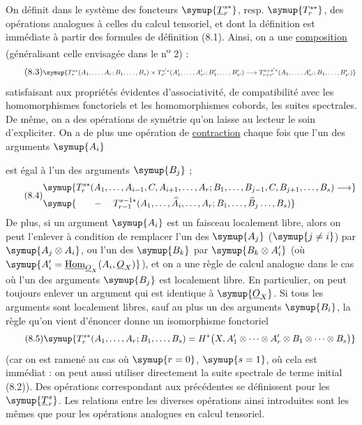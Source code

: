 On définit dans le système des foncteurs $\symup{\underline{T}_{r}^{s*}}$, resp.
$\symup{T_{r}^{s*}}$, des opérations analogues à celles du calcul tensoriel, et dont la
définition est immédiate à partir des formules de définition (8.1). Ainsi, on a
une \uline{composition} (généralisant celle envisagée dans le n\textsuperscript{o} 2) :
\begin{equation}\tag{8.3}
\resizebox{\textwidth}{!}{$\symup{
T_{r}^{s*}(A_1,\ldots,A_r;B_1,\ldots,B_s)
\times T_{r'}^{s'*}(A'_1,\ldots,A'_{r'};B'_1,\ldots,B'_{s'})
\longrightarrow T_{r+r'}^{s+s'*}
(A_1,\ldots,A'_{r'};B_1,\ldots,B'_{s'})
}$}
\end{equation}
satisfaisant aux propriétés évidentes d'associativité, de compatibilité avec
les homomorphismes fonctoriels et les homomorphismes cobords, les suites
spectrales. De même, on a des opérations de symétrie qu'on laisse au lecteur le
soin d'expliciter. On a de plus une opération de \uline{contraction} chaque fois que
l'un des arguments $\symup{A_i}$

est égal à l'un des arguments $\symup{B_j}$ ;
\begin{equation}\tag{8.4}
\resizebox{\textwidth}{!}{$
\begin{aligned}
&
\symup{T_{r}^{s*}(A_1,\ldots,A_{i-1},C,A_{i+1},\ldots,A_r;
 B_1,\ldots,B_{j-1},C,B_{j+1},\ldots,B_s)\longrightarrow}
\\
&
\symup{\qquad\relbar\quad
T_{r-1}^{s-1*}(A_1,\ldots,\widehat{A}_i,\ldots,A_r;
 B_1,\ldots,\widehat{B}_j\ldots,B_s)}
\end{aligned}
$}
\end{equation}
De plus, si un argument $\symup{A_i}$ est un faisceau localement libre, alors on peut
l'enlever à condition de remplacer l'un des $\symup{A_j}$ ($\symup{j\neq i}$) par
$\symup{A_j\otimes A_i}$, ou l'un des $\symup{B_k}$ par $\symup{B_k\otimes A_i'}$ (où
$\symup{A_i'=\Homsh_{\Osh_X}(A_i,\Osh_X)}$), et on a une règle de calcul analogue dans
le cas où l'un des arguments $\symup{B_j}$ est localement libre. En particulier, on
peut toujours enlever un argument qui est identique à $\symup{\Osh_X}$. Si tous les
arguments sont localement libres, sauf au plus un des arguments $\symup{B_i}$, la règle
qu'on vient d'énoncer donne un isomorphisme fonctoriel
\begin{equation}\tag{8.5}
  \symup{T_{r}^{s*}(A_1,\ldots,A_r;B_1,\ldots,B_s)
  =H^{*}\bigl(X,A_1'\otimes\cdots\otimes A_r'
    \otimes B_1\otimes\cdots\otimes B_s\bigr)}
\end{equation}
(car on est ramené au cas où $\symup{r=0}$, $\symup{s=1}$, où cela est immédiat : on peut
aussi utiliser directement la suite spectrale de terme initial (8.2)). Des
opérations correspondant aux précédentes se définissent pour les
$\symup{\underline{T}_{r}^{s}}$. Les relations entre les diverses opérations ainsi
introduites sont les mêmes que pour les opérations analogues en calcul
tensoriel.

